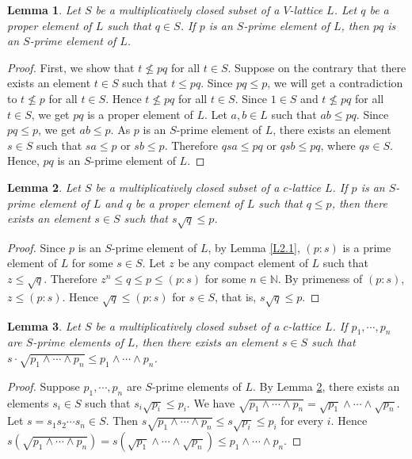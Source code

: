 \documentclass[10pt,twoside,a4paper]{amsart}
\numberwithin{equation}{section}
\theoremstyle{plain}
\newtheorem{lem}{Lemma}[section]
\theoremstyle{definition}
\begin{document}
		
	\begin{lem}%
	Let $S$ be a multiplicatively closed subset of a $V$-lattice $L$.  Let $q$ be a proper element of $L$ such that $q \in S$. If $p$ is an $S$-prime element of $L$, then $p  q$ is an $S$-prime element of $L$.
	\end{lem}
	\begin{proof} 
	First, we show that $t \nleq p  q$ for all $t \in S$. Suppose on the contrary that there exists an element $t \in S$ such that $t \leq p  q $. Since $ p  q \leq p$, we will get a contradiction to $t \nleq p$ for all $t \in S$. Hence $t \nleq p q$ for all $t \in S$. Since $1 \in S$ and $t \nleq p  q$ for all $t \in S$, we get $pq$ is a proper element of $L$. Let $a, b \in L$ such that $a  b \leq p  q$. Since $p  q \leq p$, we get $a  b \leq p$. As $p$ is an $S$-prime element of $L$, there exists an element $s \in S$ such that $s  a \leq p$  or $s  b \leq p$.  Therefore $q  s  a \leq p  q$  or $q  s  b \leq p  q$, where $q  s \in S$. Hence, $p  q$ is an $S$-prime element of $L$.  
	\end{proof}
	
	
	\begin{lem}\label{L2.8}
	Let  $S$ be a multiplicatively closed subset of a $c$-lattice $L$.  If $p$ is an $S$-prime element of $L$ and $q$ be a proper element of $L$ such that $q \leq p$, then there exists an element $s \in S$ such that $s  \sqrt{q} \leq p$.
	\end{lem}
	\begin{proof} Since $p$ is an $S$-prime element of $L$, by Lemma \ref{L2.1}, $(p : s)$ is a prime element of $L$ for some $s \in S$.	Let $z$ be any compact element of $L$ such that $z \leq \sqrt{q}$. Therefore $z^n \leq q \leq p \leq (p : s)$ for some $n \in \mathbb{N}$. By primeness of $( p : s)$, $z \leq (p : s)$. Hence  $\sqrt{q} \leq (p :s)$ for $s \in S$, that is,  $s \sqrt{q} \leq p$.      
	\end{proof}
	
	
	\begin{lem}%
	Let  $S$ be a multiplicatively closed subset of a $c$-lattice $L$.   If $p_1,\cdots, p_n$ are  $S$-prime elements of $L$, then there exists an element $s \in S$ such that $s \cdot \sqrt{p_1 \wedge \cdots \wedge p_n} \leq p_1 \wedge \cdots\wedge p_n$.
	\end{lem}
		
	\begin{proof}
	Suppose $p_1, \cdots, p_n$ are  $S$-prime elements of $L$. By Lemma \ref{L2.8}, there exists an elements $s_i \in S$ such that $s_i  \sqrt{p_i} \leq p_i$. We have $\sqrt{p_1 \wedge \cdots \wedge p_n} = \sqrt{p_1} \wedge \cdots \wedge \sqrt{p_n}$. Let $s = s_1 s_2 \cdots s_n \in S$. Then $s  \sqrt{p_1 \wedge \cdots \wedge p_n}  \leq s  \sqrt{p_i} \leq p_i$ for every $i$. Hence $ s  (\sqrt{p_1 \wedge \cdots  \wedge p_n}) = s  (\sqrt{p_1} \wedge \cdots  \wedge \sqrt{p_n})  \leq p_1 \wedge \cdots \wedge p_n$. 
	\end{proof}
		
\end{document}
